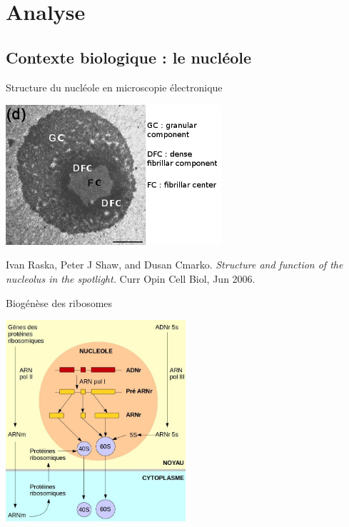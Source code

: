 \documentclass{beamer}
\begin{document}

\section{Analyse}

\subsection{Contexte biologique : le nucléole}

\begin{frame}
  
  \begin{block}{Structure du nucléole en microscopie électronique}

    \begin{center}
      \includegraphics[width=0.6\textwidth]{img/microNuc.png}
    \end{center}

    
    Ivan Raska, Peter J Shaw, and Dusan Cmarko. \textit{Structure and function of the nucleolus in the spotlight.} Curr Opin Cell Biol, Jun 2006.
  \end{block}

\end{frame}

\begin{frame}
  
  \begin{block}{Biogénèse des ribosomes}
  \begin{center}
    \includegraphics[width=0.5\textwidth]{img/biogenese.png}
  \end{center}
  \end{block}

\end{frame}
\end{document}
